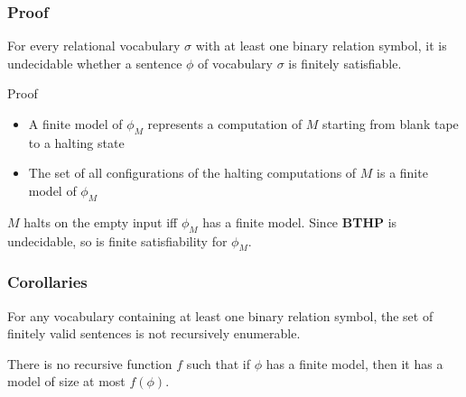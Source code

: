\documentclass{beamer}
\begin{document}
\begin{frame}
  \frametitle{Proof}

  \begin{theorem}[Trakhtenbrot]
    For every relational vocabulary $\sigma$ with at least one binary relation
    symbol, it is undecidable whether a sentence $\phi$ of vocabulary
    $\sigma$ is finitely satisfiable.
  \end{theorem}
  
  \begin{alertblock}{Proof}

  \begin{itemize}
    \item A finite model of $\phi_M$ represents a computation of $M$ starting
    from blank tape to a halting state
    \item The set of all configurations of the halting computations of $M$ is a
    finite model of $\phi_M$
  \end{itemize}

  $M$ halts on the empty input iff $\phi_M$ has a finite model. Since
  \textbf{BTHP} is undecidable, so is finite satisfiability for $\phi_M$.
  \end{alertblock}
  
\end{frame}

\begin{frame}
  \frametitle{Corollaries}

  \begin{corollary}
    For any vocabulary containing at least one binary relation symbol, the set
    of finitely valid sentences is not recursively enumerable.
  \end{corollary}

  \begin{corollary}
    There is no recursive function $f$ such that if $\phi$ has a finite model,
    then it has a model of size at most $f(\phi)$.
  \end{corollary}
  
\end{frame}
\end{document}
